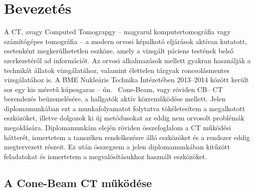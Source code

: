 \documentclass[a4paper,12pt]{article}
\begin{document}
\hspace{9cm}




\clearpage


 \tableofcontents

\clearpage

	






\section{Bevezetés}


A CT, avagy Computed Tomograpgy -- magyarul komputertomográfia vagy számítógépes tomográfia -- a modern orvosi képalkotó eljárások  aktívan kutatott, esetenként megkerülhetetlen eszköze, amely a vizsgált páciens testének belső szerkezetéről ad információt. Az orvosi alkalmazások mellett  gyakran használják a technikát állatok vizsgálatához, valamint élettelen tárgyak roncsolásmentes vizsgálatához is. A BME Nukleáris Technika Intézetében 2013--2014 között került sor egy kis méretű kúpsugaras -- ún.~ Cone-Beam, vagy röviden CB-- CT berendezés beüzemelésére, a hallgatók aktív közreműködése mellett. Jelen diplomamunkában ezt a munkafolyamatot folytatva tökéletesítem a megalkotott eszközöket, illetve dolgozok ki új metódusokat az eddig nem orvosolt problémák megoldására. Diplomamunkám elején röviden összefoglalom a CT működési hátterét, ismertetem a tanszéken rendelkezésre álló eszközöket és a rendszer eddig megtervezett részeit. Ez után összegzem a jelen diplomamunkában kitűzött feladatokat és ismertetem a megvalósításukhoz használt eszközöket.

\subsection{A Cone-Beam CT működése } 
\end{document}
